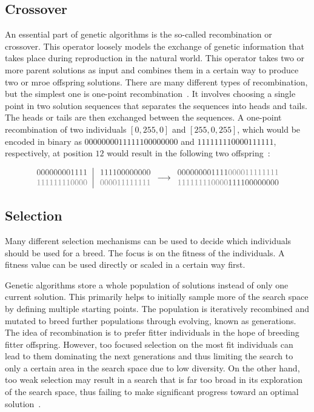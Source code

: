 \documentclass[paper=a4,%
  twoside,%
  BCOR4mm,%
  abstract=true,%
  toc=bibliography,%
  chapterprefix=true,%
  toc=bibliographynumbered,%
  open=right,%
  english,%
  pagesize=pdftex]{scrreprt}
\begin{document}
\subsection{Crossover}
\label{sec:background-crossover}
An essential part of genetic algorithms is the so-called recombination or crossover. This operator loosely models the exchange of genetic information that takes place during reproduction in the natural world. This operator takes two or more parent solutions as input and combines them in a certain way to produce two or mroe offspring solutions. There are many different types of recombination, but the simplest one is one-point recombination~\cite{McMinn_2004}. It involves choosing a single point in two solution sequences that separates the sequences into heads and tails. The heads or tails are then exchanged between the  sequences. A one-point recombination of two individuals $[0, 255, 0]$ and $[255, 0, 255]$, which would be encoded in binary as $0000000011111100000000$ and $111111110000111111$, respectively, at position $12$ would result in the following two offspring~\cite{McMinn_2004}:

\[
\left.\begin{array}{c}
\textcolor{webgreen}{000000001111} \\  %
\textcolor{thesisblue}{111111110000} %
\end{array}\right|
\begin{array}{c}
\textcolor{webgreen}{111100000000} \\  %
\textcolor{thesisblue}{000011111111} %
\end{array} \longrightarrow
\begin{array}{c}
\textcolor{webgreen}{000000001111}\textcolor{thesisblue}{000011111111} \\  %
\textcolor{thesisblue}{111111110000}\textcolor{webgreen}{111100000000} %
\end{array}
\]


\subsection{Selection}
Many different selection mechanisms can be used to decide which individuals should be used for a breed. The focus is on the fitness of the individuals. A fitness value can be used directly or scaled in a certain way first.

Genetic algorithms store a whole population of solutions instead of only one current solution. This primarily helps to initially sample more of the search space by defining multiple starting points. The population is iteratively recombined and mutated to breed further populations through evolving, known as generations. The idea of recombination is to prefer fitter individuals in the hope of breeding fitter offspring. However, too focused selection on the most fit individuals can lead to them dominating the next generations and thus limiting the search to only a certain area in the search space due to low diversity. On the other hand, too weak selection may result in a search that is far too broad in its exploration of the search space, thus failing to make significant progress toward an optimal solution~\cite{McMinn_2004}.
\end{document}
